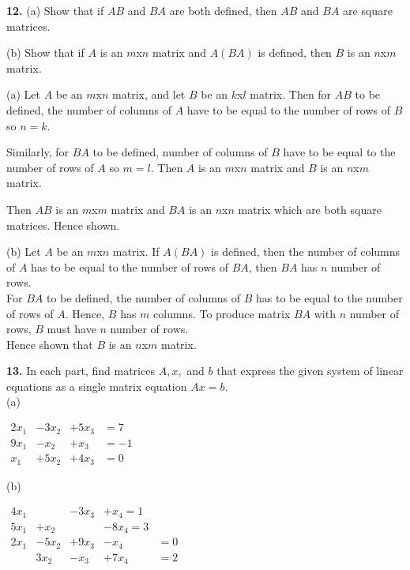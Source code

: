 \documentclass[addpoints]{exam}
\begin{document}
\begin{sloppypar}
\begin{questions}
    \question
    \textbf{12. } (a) Show that if $AB$ and $BA$ are both defined, then $AB$ and $BA$ are square matrices. 

    \hspace{7.5mm} (b) Show that if $A$ is an $m$x$n$ matrix and $A(BA)$ is defined, then $B$ is an $n$x$m$ matrix.
    \begin{solution}
        
        (a) Let $A$ be an $m$x$n$ matrix, and let $B$ be an $k$x$l$ matrix. Then for $AB$ to be defined, the number of columns of $A$ have to be equal to the number of rows of $B$ so $n = k$. 

        Similarly, for $BA$ to be defined, number of columns of $B$ have to be equal to the number of rows of $A$ so $m = l$. Then $A$ is an $m$x$n$ matrix and $B$ is an $n$x$m$ matrix. 
        
        Then $AB$ is an $m$x$m$ matrix and $BA$ is an $n$x$n$ matrix which are both square matrices. Hence shown. 

        (b) Let $A$ be an $m$x$n$ matrix. If $A(BA)$ is defined, then the number of columns of $A$ has to be equal to the number of rows of $BA$, then $BA$ has $n$ number of rows. \\ 
        For $BA$ to be defined, the number of columns of $B$ has to be equal to the number of rows of $A$. Hence, $B$ has $m$ columns. To produce matrix $BA$ with $n$ number of rows, $B$ must have $n$ number of rows. \\ 
        Hence shown that $B$ is an $n$x$m$ matrix.
    \end{solution}

    \question
    \textbf{13. } In each part, find matrices $A, x,$ and $b$ that express the given system of linear equations as a single matrix equation $ Ax = b $. \\ 
    (a) 
    
    $ \begin{matrix}
        2x_1 &- 3x_2 & +5x_3 & = 7 \\ 
        9x_1 & -x_2 & +x_3 & = -1 \\ 
        x_1 & +5x_2 & +4x_3 & = 0
    \end{matrix} $

    (b) 
    
    $ \begin{matrix}
        4x_1 & & -3x_3 & +x_4 = 1 \\ 
        5x_1 & +x_2 & & -8x_4 = 3 \\ 
        2x_1 & -5x_2 & +9x_3 & -x_4 & = 0 \\ 
        & 3x_2 & -x_3 & +7x_4 & = 2
    \end{matrix} $
    \begin{solution}


\end{solution}
\end{questions}
\end{sloppypar}
\end{document}
